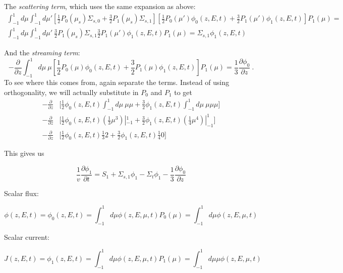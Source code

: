 \documentclass[12pt]{article}
\newcommand{\sigso}{\ensuremath{\Sigma_{s,0}}}
\newcommand{\sigsi}{\ensuremath{\Sigma_{s,1}}}
\begin{document}
The \textit{scattering term}, which uses the same expansion as above:
\begin{multline*}
\int_{-1}^{1}d\mu\int_{-1}^{1}d\mu'\left[\frac{1}{2}P_0(\mu_s)\sigso+\frac{3}{2}P_1(\mu_s)\sigsi\right]
\left[\frac{1}{2}P_0(\mu')\phi_0(z,E,t)+\frac{3}{2}P_1(\mu')\phi_1(z,E,t)\right]P_1(\mu) = \\
\int_{-1}^{1}d\mu\int_{-1}^{1}d\mu'\:\frac{3}{2}P_1(\mu_s)\sigsi\frac{3}{2}P_1(\mu')\phi_1(z,E,t)P_1(\mu) =
\sigsi\phi_1(z,E,t)
\end{multline*}

And the \textit{streaming term}:
\begin{equation*}
-\frac{\partial}{\partial z}\int_{-1}^{1}d\mu\:\mu\left[\frac{1}{2}P_0(\mu)\phi_0(z,E,t)+\frac{3}{2}P_1(\mu)\phi_1(z,E,t)\right]P_1(\mu)
= \frac{1}{3}\frac{\partial\phi_0}{\partial z}\:.
\end{equation*}
%
To see where this comes from, again separate the terms. Instead of using orthogonality, we will actually substitute in $P_0$ and $P_1$ to get
\begin{align*}
-\frac{\partial}{\partial z}&\bigl[ \frac{1}{2}\phi_0(z,E,t)\int_{-1}^{1}d\mu\:\mu\mu+\frac{3}{2}\phi_1(z,E,t)\int_{-1}^{1}d\mu\:\mu \mu \mu \bigr] \\
-\frac{\partial}{\partial z}&\bigl[ \frac{1}{2}\phi_0(z,E,t)\left(\frac{1}{3}\mu^3\right)|_{-1}^1+\frac{3}{2}\phi_1(z,E,t)\left(\frac{1}{4}\mu^4\right)|_{-1}^1\bigr] \\
-\frac{\partial}{\partial z}&\bigl[ \frac{1}{2}\phi_0(z,E,t)\frac{1}{3}2+\frac{3}{2}\phi_1(z,E,t)\frac{1}{4}0\bigr] 
\end{align*} 

This gives us

\begin{equation*}
\frac{1}{v}\frac{\partial\phi_1}{\partial t} = S_1 + \sigsi\phi_1 - \Sigma_t\phi_1 - 
\frac{1}{3}\frac{\partial\phi_0}{\partial z}
\end{equation*}

Scalar flux:

\begin{equation*}
\phi(z,E,t) = \phi_0(z,E,t) = \int_{-1}^{1}d\mu\phi(z,E,\mu,t)P_0(\mu) = \int_{-1}^{1}d\mu\phi(z,E,\mu,t)
\end{equation*}

Scalar current:

\begin{equation*}
J(z,E,t) = \phi_1(z,E,t) = \int_{-1}^{1}d\mu\phi(z,E,\mu,t)P_1(\mu) = \int_{-1}^{1}d\mu\mu\phi(z,E,\mu,t)
\end{equation*}
\end{document}
